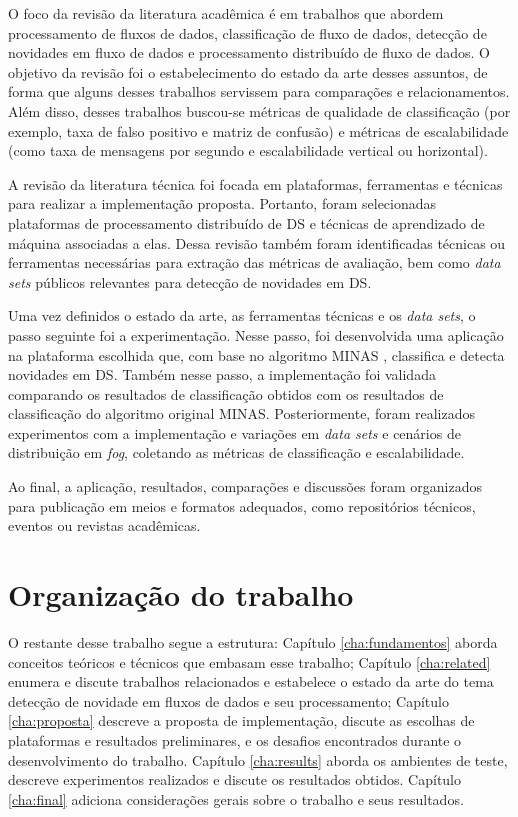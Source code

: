 O foco da revisão da literatura acadêmica é em trabalhos que abordem
processamento de fluxos de dados, classificação de fluxo de dados, detecção de
novidades em fluxo de dados e processamento distribuído de fluxo de dados.
O objetivo da revisão foi o estabelecimento do estado da arte desses assuntos,
de forma que alguns desses trabalhos servissem para comparações e relacionamentos.
Além disso, desses trabalhos buscou-se métricas de qualidade de classificação
(por exemplo, taxa de falso positivo e matriz de confusão) e métricas de
escalabilidade (como taxa de mensagens por segundo e escalabilidade vertical ou
horizontal).

A revisão da literatura técnica foi focada em plataformas, ferramentas e técnicas
para realizar a implementação proposta.
Portanto, foram selecionadas plataformas de processamento distribuído de DS
e técnicas de aprendizado de máquina associadas a elas.
Dessa revisão também foram identificadas técnicas ou ferramentas necessárias
para extração das métricas de avaliação, bem como \emph{data sets}
públicos relevantes para detecção de novidades em DS.

Uma vez definidos o estado da arte, as ferramentas técnicas e os
\emph{data sets}, o passo seguinte foi a experimentação.
Nesse passo, foi desenvolvida uma aplicação na plataforma escolhida que, com base no
algoritmo MINAS \cite{Faria2016minas}, classifica e detecta novidades em DS.
Também nesse passo, a implementação foi validada comparando os resultados de
classificação obtidos com os resultados de classificação do algoritmo original
MINAS.
Posteriormente, foram realizados experimentos com a implementação e variações em \emph{data sets} e
cenários de distribuição em \emph{fog}, coletando as métricas de classificação e escalabilidade.

Ao final, a aplicação, resultados, comparações e discussões foram organizados para publicação 
em meios e formatos adequados, como repositórios técnicos, eventos ou revistas
acadêmicas.

\section{Organização do trabalho}

O restante desse trabalho segue a estrutura:
Capítulo \ref{cha:fundamentos} aborda conceitos teóricos e técnicos que embasam
esse trabalho;
Capítulo \ref{cha:related} enumera e discute trabalhos relacionados e estabelece
o estado da arte do tema detecção de novidade em fluxos de dados e seu
processamento;
Capítulo \ref{cha:proposta} descreve a proposta de implementação, discute as
escolhas de plataformas e resultados preliminares, e os desafios encontrados 
durante o desenvolvimento do trabalho.
Capítulo \ref{cha:results} aborda os ambientes de teste, descreve experimentos
realizados e discute os resultados obtidos.
Capítulo \ref{cha:final} adiciona considerações gerais sobre o trabalho e seus
resultados.

